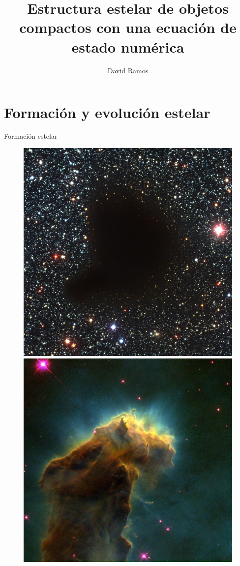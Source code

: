 \documentclass[11pt]{beamer}
\title[Estructura estelar de objetos compactos]{Estructura estelar de objetos compactos con una ecuación de estado numérica}
\author[David Ramos]{David Ramos}
\begin{document}
	\typesetFrontSlides


\section{Formación y evolución estelar}


\begin{frame}{Formación estelar}
    \centering
    \begin{figure}
    \centering
    \begin{minipage}{.52\linewidth}
        \centering
        \includegraphics[width=.9\linewidth]{barnard.jpg}
    \end{minipage}%
    \begin{minipage}{.52\linewidth}
        \centering
        \includegraphics[width=0.9\linewidth]{eagle.jpg}

\end{minipage}
\end{figure}
\end{frame}
\end{document}
